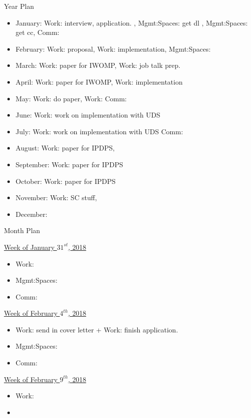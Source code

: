 \begin{columns}
\begin{column}{0.333\columnwidth}
\begin{columns}
\begin{column}{0.10\linewidth}
\begin{block}{Year Plan}
\begin{itemize}
\tiny \item \tiny January: Work: interview, application. , Mgmt:Spaces: get dl , Mgmt:Spaces: get cc, Comm: 
\item \tiny February: Work: proposal, Work: implementation, Mgmt:Spaces: 
\item \tiny March: Work: paper for IWOMP, Work: job talk prep.
\item \tiny April: Work: paper for IWOMP, Work: implementation  
\item \tiny May: Work: do paper, Work: Comm: 
\item \tiny June: Work: work on implementation with UDS 
\item \tiny July: Work: work on implementation with UDS Comm:  
\item \tiny August: Work: paper for IPDPS, 
\item \tiny September: Work: paper for IPDPS 
\item \tiny October: Work: paper for IPDPS  
\item \tiny November: Work: SC stuff, 
\item \tiny December: 
\end{itemize} 
\end{block}

\begin{block}{Month Plan} 

\underline{Week of January $31^{st}$, 2018} 
\begin{itemize}
\tiny \item \tiny Work: 
\item \tiny Mgmt:Spaces: 
\item \tiny Comm: 
\end{itemize}

\underline{Week of February $4^{th}$, 2018}
\begin{itemize}
\tiny \item \tiny Work: send in cover letter + Work: finish application.  
\item \tiny Mgmt:Spaces: 
\item \tiny Comm: 
\end{itemize}

\underline{Week of February $9^{th}$, 2018}
\begin{itemize}
\tiny \item \tiny Work: 
\item \tiny
\end{itemize}


\end{block}
\end{column}
\end{columns}
\end{column}
\end{columns}
